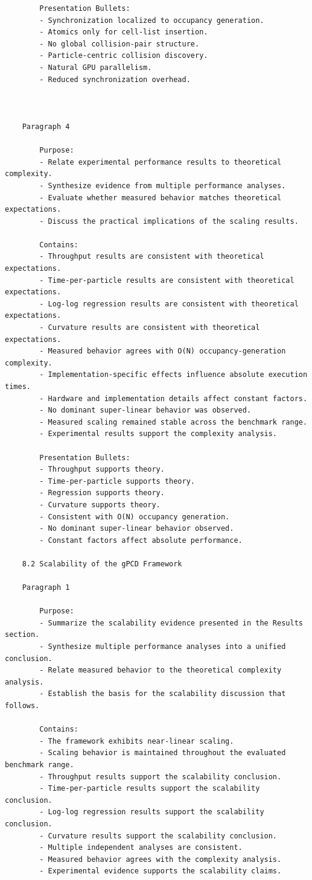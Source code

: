 \begin{verbatim}
		Presentation Bullets:
		- Synchronization localized to occupancy generation.
		- Atomics only for cell-list insertion.
		- No global collision-pair structure.
		- Particle-centric collision discovery.
		- Natural GPU parallelism.
		- Reduced synchronization overhead.



	Paragraph 4

		Purpose:
		- Relate experimental performance results to theoretical complexity.
		- Synthesize evidence from multiple performance analyses.
		- Evaluate whether measured behavior matches theoretical expectations.
		- Discuss the practical implications of the scaling results.

		Contains:
		- Throughput results are consistent with theoretical expectations.
		- Time-per-particle results are consistent with theoretical expectations.
		- Log-log regression results are consistent with theoretical expectations.
		- Curvature results are consistent with theoretical expectations.
		- Measured behavior agrees with O(N) occupancy-generation complexity.
		- Implementation-specific effects influence absolute execution times.
		- Hardware and implementation details affect constant factors.
		- No dominant super-linear behavior was observed.
		- Measured scaling remained stable across the benchmark range.
		- Experimental results support the complexity analysis.

		Presentation Bullets:
		- Throughput supports theory.
		- Time-per-particle supports theory.
		- Regression supports theory.
		- Curvature supports theory.
		- Consistent with O(N) occupancy generation.
		- No dominant super-linear behavior observed.
		- Constant factors affect absolute performance.

	8.2 Scalability of the gPCD Framework

	Paragraph 1

		Purpose:
		- Summarize the scalability evidence presented in the Results section.
		- Synthesize multiple performance analyses into a unified conclusion.
		- Relate measured behavior to the theoretical complexity analysis.
		- Establish the basis for the scalability discussion that follows.

		Contains:
		- The framework exhibits near-linear scaling.
		- Scaling behavior is maintained throughout the evaluated benchmark range.
		- Throughput results support the scalability conclusion.
		- Time-per-particle results support the scalability conclusion.
		- Log-log regression results support the scalability conclusion.
		- Curvature results support the scalability conclusion.
		- Multiple independent analyses are consistent.
		- Measured behavior agrees with the complexity analysis.
		- Experimental evidence supports the scalability claims.


\end{verbatim}

